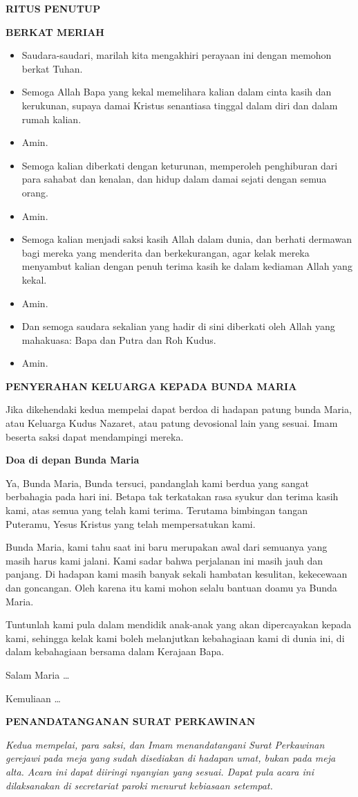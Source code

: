 \documentclass[a5paper,titlepage,11pt,openany]{scrbook}
\makeatletter
\newcommand{\judul}[1]{%
  {\parindent \z@ \centering 
    \interlinepenalty\@M \Large \bfseries #1\par\nobreak \vskip 20\p@ }}
\newcommand{\subjudul}[1]{%
  {\parindent \z@ 
    \interlinepenalty\@M \large \bfseries #1\par\nobreak \vskip 10\p@ }}
\newcommand{\subsubjudul}[1]{%
  {\parindent \z@ 
    \interlinepenalty\@M \bfseries #1\par\nobreak \vskip 10\p@ }}
\newcommand{\BU}[1]{\begin{itemize} \item[U:] #1 \end{itemize}}
\newcommand{\BI}[1]{\begin{itemize} \item[I:] #1 \end{itemize}}
\makeatother
\begin{document}
\judul{RITUS PENUTUP}

\subjudul{BERKAT MERIAH}

\BI{Saudara-saudari, marilah kita mengakhiri perayaan ini dengan memohon berkat Tuhan.}

\BI{Semoga Allah Bapa yang kekal memelihara kalian dalam cinta kasih dan kerukunan, supaya damai Kristus senantiasa tinggal dalam diri dan dalam rumah kalian.}
\BU{Amin.}

\BI{Semoga kalian diberkati dengan keturunan, memperoleh penghiburan dari para sahabat dan kenalan, dan hidup dalam damai sejati dengan semua orang.}
\BU{Amin.}

\BI{Semoga kalian menjadi saksi kasih Allah dalam dunia, dan berhati dermawan bagi mereka yang menderita dan berkekurangan, agar kelak mereka menyambut kalian dengan penuh terima kasih ke dalam kediaman Allah yang kekal.}
\BU{Amin.}

\BI{Dan semoga saudara sekalian yang hadir di sini diberkati oleh Allah yang mahakuasa: Bapa \CrossOpenShadow dan Putra dan Roh Kudus.}
\BU{Amin.}


\subjudul{PENYERAHAN KELUARGA KEPADA BUNDA MARIA}

Jika dikehendaki kedua mempelai dapat berdoa di hadapan patung bunda Maria, atau Keluarga Kudus Nazaret, atau patung devosional lain yang sesuai. Imam beserta saksi dapat mendampingi mereka.

\subsubjudul{Doa di depan Bunda Maria}

Ya, Bunda Maria, Bunda tersuci, pandanglah kami berdua yang sangat berbahagia pada hari ini. Betapa tak terkatakan rasa syukur dan terima kasih kami, atas semua yang telah kami terima. Terutama bimbingan tangan Puteramu, Yesus Kristus yang telah mempersatukan kami.

Bunda Maria, kami tahu saat ini baru merupakan awal dari semuanya yang masih harus kami jalani. Kami sadar bahwa perjalanan ini masih jauh dan panjang. Di hadapan kami masih banyak sekali hambatan kesulitan, kekecewaan dan goncangan. Oleh karena itu kami mohon selalu bantuan doamu ya Bunda Maria.

Tuntunlah kami pula dalam mendidik anak-anak yang akan dipercayakan kepada kami, sehingga kelak kami boleh melanjutkan kebahagiaan kami di dunia ini, di dalam kebahagiaan bersama dalam Kerajaan Bapa.

Salam Maria \ldots

Kemuliaan \ldots



\subsubjudul{PENANDATANGANAN SURAT PERKAWINAN}
\textit{Kedua mempelai, para saksi, dan Imam menandatangani Surat Perkawinan gerejawi pada meja yang sudah disediakan di hadapan umat, bukan pada meja alta. Acara ini dapat diiringi nyanyian yang sesuai. Dapat pula acara ini dilaksanakan di secretariat paroki menurut kebiasaan setempat.}
\end{document}

